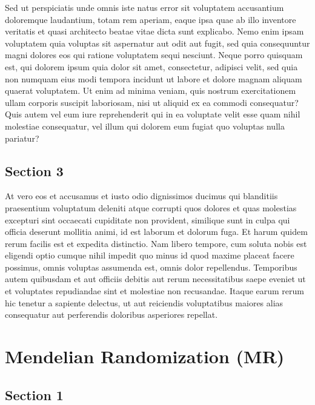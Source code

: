 \documentclass[
]{book}
\begin{document}
Sed ut perspiciatis unde omnis iste natus error sit voluptatem accusantium doloremque laudantium, totam rem aperiam, eaque ipsa quae ab illo inventore veritatis et quasi architecto beatae vitae dicta sunt explicabo. Nemo enim ipsam voluptatem quia voluptas sit aspernatur aut odit aut fugit, sed quia consequuntur magni dolores eos qui ratione voluptatem sequi nesciunt. Neque porro quisquam est, qui dolorem ipsum quia dolor sit amet, consectetur, adipisci velit, sed quia non numquam eius modi tempora incidunt ut labore et dolore magnam aliquam quaerat voluptatem. Ut enim ad minima veniam, quis nostrum exercitationem ullam corporis suscipit laboriosam, nisi ut aliquid ex ea commodi consequatur? Quis autem vel eum iure reprehenderit qui in ea voluptate velit esse quam nihil molestiae consequatur, vel illum qui dolorem eum fugiat quo voluptas nulla pariatur?

\hypertarget{section-3-7}{%
\section{Section 3}\label{section-3-7}}

At vero eos et accusamus et iusto odio dignissimos ducimus qui blanditiis praesentium voluptatum deleniti atque corrupti quos dolores et quas molestias excepturi sint occaecati cupiditate non provident, similique sunt in culpa qui officia deserunt mollitia animi, id est laborum et dolorum fuga. Et harum quidem rerum facilis est et expedita distinctio. Nam libero tempore, cum soluta nobis est eligendi optio cumque nihil impedit quo minus id quod maxime placeat facere possimus, omnis voluptas assumenda est, omnis dolor repellendus. Temporibus autem quibusdam et aut officiis debitis aut rerum necessitatibus saepe eveniet ut et voluptates repudiandae sint et molestiae non recusandae. Itaque earum rerum hic tenetur a sapiente delectus, ut aut reiciendis voluptatibus maiores alias consequatur aut perferendis doloribus asperiores repellat.

\hypertarget{mendelian-randomization-mr-1}{%
\chapter{Mendelian Randomization (MR)}\label{mendelian-randomization-mr-1}}

\hypertarget{section-1-8}{%
\section{Section 1}\label{section-1-8}}
\end{document}
